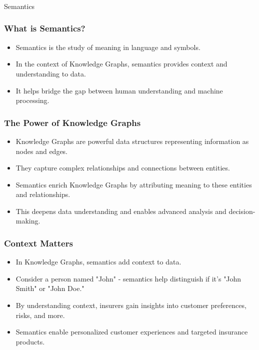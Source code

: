 \begin{frame}[fragile]\frametitle{}
\begin{center}
{\Large Semantics}
\end{center}
\end{frame}


\begin{frame}[fragile]\frametitle{What is Semantics?}
  \begin{itemize}
    \item Semantics is the study of meaning in language and symbols.
    \item In the context of Knowledge Graphs, semantics provides context and understanding to data.
    \item It helps bridge the gap between human understanding and machine processing.
  \end{itemize}
\end{frame}

\begin{frame}[fragile]\frametitle{The Power of Knowledge Graphs}
  \begin{itemize}
    \item Knowledge Graphs are powerful data structures representing information as nodes and edges.
    \item They capture complex relationships and connections between entities.
    \item Semantics enrich Knowledge Graphs by attributing meaning to these entities and relationships.
    \item This deepens data understanding and enables advanced analysis and decision-making.
  \end{itemize}
\end{frame}

\begin{frame}[fragile]\frametitle{Context Matters}
  \begin{itemize}
    \item In Knowledge Graphs, semantics add context to data.
    \item Consider a person named "John" - semantics help distinguish if it's "John Smith" or "John Doe."
    \item By understanding context, insurers gain insights into customer preferences, risks, and more.
    \item Semantics enable personalized customer experiences and targeted insurance products.
  \end{itemize}
\end{frame}

